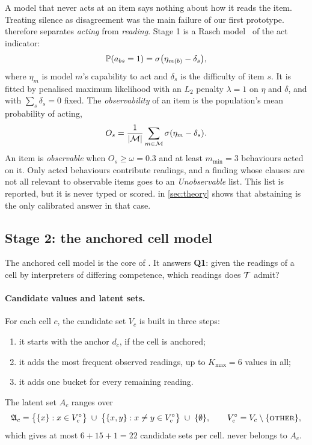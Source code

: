 A model that never acts at an item says nothing about how it reads the item. Treating silence as disagreement was the main failure of our first prototype. \specdx therefore separates \emph{acting} from \emph{reading}. Stage 1 is a Rasch model~\cite{rodriguez2021evaluation,lalor2016building} of the act indicator:
\begin{equation}
\label{eq:rasch}
\mathbb{P}(a_{bs}=1)=\sigma\bigl(\eta_{m(b)}-\delta_s\bigr),
\end{equation}
where $\eta_m$ is model $m$'s capability to act and $\delta_s$ is the difficulty of item $s$. It is fitted by penalised maximum likelihood with an $L_2$ penalty $\lambda=1$ on $\eta$ and $\delta$, and with $\sum_s\delta_s=0$ fixed. The \emph{observability} of an item is the population's mean probability of acting,
\begin{equation}
\label{eq:observability}
O_s=\frac{1}{|\mathcal{M}|}\sum_{m\in\mathcal{M}}\sigma(\eta_m-\delta_s).
\end{equation}
An item is \emph{observable} when $O_s\ge\omega=0.3$ and at least $m_{\min}=3$ behaviours acted on it. Only acted behaviours contribute readings, and a finding whose clauses are not all relevant to observable items goes to an \emph{Unobservable} list. This list is reported, but it is never typed or scored.  in \cref{sec:theory} shows that abstaining is the only calibrated answer in that case.

\subsection{Stage 2: the anchored cell model}
\label{sec:approach-model}

The anchored cell model is the core of \specdx. It answers \textbf{Q1}: given the readings of a cell by interpreters of differing competence, which readings does $\mathcal{T}$ admit?

\paragraph{Candidate values and latent sets.} For each cell $c$, the candidate set $V_c$ is built in three steps:
\begin{enumerate}[leftmargin=*]
\item it starts with the anchor $d_c$, if the cell is anchored;
\item it adds the most frequent observed readings, up to $K_{\max}=6$ values in all;
\item it adds one bucket \other for every remaining reading.
\end{enumerate}
The latent set $A_c$ ranges over
\begin{equation}
\label{eq:sets}
\mathfrak{A}_c=\bigl\{\{x\}:x\in V_c^\circ\bigr\}\;\cup\;\bigl\{\{x,y\}:x\neq y\in V_c^\circ\bigr\}\;\cup\;\{\emptyset\},\qquad V_c^\circ=V_c\setminus\{\textsc{other}\},
\end{equation}
which gives at most $6+15+1=22$ candidate sets per cell. \other never belongs to $A_c$.

